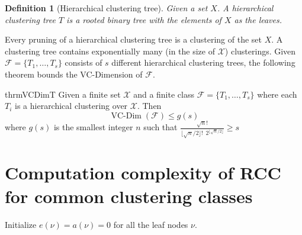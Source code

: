 \documentclass[12pt]{article}
\newtheorem{definition}[theorem]{Definition}
\newcommand{\mc}{\mathcal}
\DeclareMathOperator*{\vcdim}{VC-Dim}
\begin{document}
\begin{definition}[Hierarchical clustering tree]
Given a set $X$. A hierarchical clustering tree $T$ is a rooted binary tree with the elements of $X$ as the leaves. 
\end{definition}

\noindent Every pruning of a hierarchical clustering tree is a clustering of the set $X$. A clustering tree contains exponentially many (in the size of $\mc X$) clusterings. Given $\mc F = \{T_1, \ldots, T_s\}$ consists of $s$ different hierarchical clustering trees, the following theorem bounds the VC-Dimension of ${\mc F}$.

\begin{restatable}{thrm}{VCDimT}
Given a finite set $\mc X$ and a finite class $\mc F = \{T_1, \ldots, T_s\}$ where each $T_i$ is a hierarchical clustering over $\mc X$. Then 
$$\vcdim({\mc F}) \le g(s)$$ where $g(s)$ is the smallest integer $n$ such that $\frac{\sqrt n!}{\lfloor \sqrt n/2 \rfloor! \enspace 2^{\lfloor \sqrt n/2 \rfloor}} \ge s $
\end{restatable}


\section{Computation complexity of RCC for common clustering classes}
\label{section:efficientERM}

\SetAlgoNoLine
\LinesNumbered
\SetNlSkip{-0.4em}
\begin{algorithm}[h]
\caption{ERM approach for a hierarchical clustering tree}
\label{alg:ERMTrees}
\Indp{}

\vspace{0.1in} Initialize $e(\nu) = a(\nu) = 0$ for all the leaf nodes $\nu$. \\
\end{algorithm}
\end{document}
